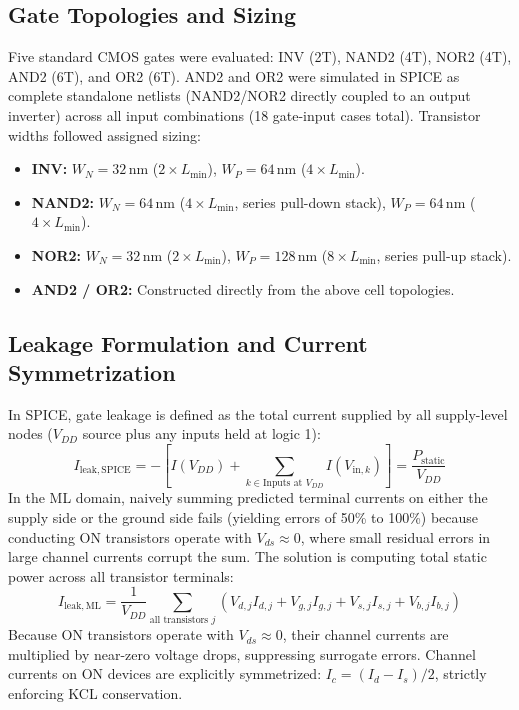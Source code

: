 \documentclass[11pt,a4paper]{article}
\numberwithin{table}{section}
\numberwithin{figure}{section}
\begin{document}
\subsection{Gate Topologies and Sizing}
Five standard CMOS gates were evaluated: INV (2T), NAND2 (4T), NOR2 (4T), AND2 (6T), and OR2 (6T). AND2 and OR2 were simulated in SPICE as complete standalone netlists (NAND2/NOR2 directly coupled to an output inverter) across all input combinations (18 gate-input cases total). Transistor widths followed assigned sizing:
\begin{itemize}[noitemsep]
    \item \textbf{INV:} $W_N = 32\,\mathrm{nm}$ ($2\times L_{\min}$), $W_P = 64\,\mathrm{nm}$ ($4\times L_{\min}$).
    \item \textbf{NAND2:} $W_N = 64\,\mathrm{nm}$ ($4\times L_{\min}$, series pull-down stack), $W_P = 64\,\mathrm{nm}$ ($4\times L_{\min}$).
    \item \textbf{NOR2:} $W_N = 32\,\mathrm{nm}$ ($2\times L_{\min}$), $W_P = 128\,\mathrm{nm}$ ($8\times L_{\min}$, series pull-up stack).
    \item \textbf{AND2 / OR2:} Constructed directly from the above cell topologies.
\end{itemize}

\subsection{Leakage Formulation and Current Symmetrization}
In SPICE, gate leakage is defined as the total current supplied by all supply-level nodes ($V_{DD}$ source plus any inputs held at logic 1):
\begin{equation}
I_{\mathrm{leak, SPICE}} = -\left[ I(V_{DD}) + \sum_{k \in \text{Inputs at } V_{DD}} I(V_{\mathrm{in}, k}) \right] = \frac{P_{\mathrm{static}}}{V_{DD}}
\end{equation}
In the ML domain, naively summing predicted terminal currents on either the supply side or the ground side fails (yielding errors of 50\% to 100\%) because conducting ON transistors operate with $V_{ds} \approx 0$, where small residual errors in large channel currents corrupt the sum. The solution is computing total static power across all transistor terminals:
\begin{equation}
I_{\mathrm{leak, ML}} = \frac{1}{V_{DD}} \sum_{\text{all transistors } j} \left( V_{d,j} I_{d,j} + V_{g,j} I_{g,j} + V_{s,j} I_{s,j} + V_{b,j} I_{b,j} \right)
\end{equation}
Because ON transistors operate with $V_{ds} \approx 0$, their channel currents are multiplied by near-zero voltage drops, suppressing surrogate errors. Channel currents on ON devices are explicitly symmetrized: $I_c = (I_d - I_s)/2$, strictly enforcing KCL conservation.
\end{document}
